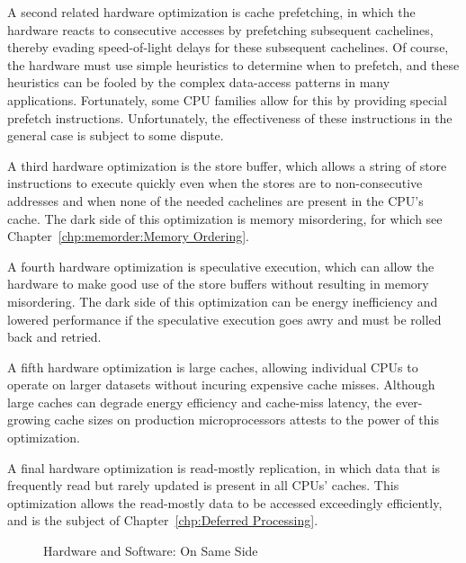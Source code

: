 A second related hardware optimization is cache prefetching, in which
the hardware reacts to consecutive accesses by prefetching subsequent
cachelines, thereby evading speed-of-light delays for these
subsequent cachelines.
Of course, the hardware must use simple heuristics to determine when
to prefetch, and these heuristics can be fooled by the complex data-access
patterns in many applications.
Fortunately, some CPU families allow for this by providing special
prefetch instructions.
Unfortunately, the effectiveness of these instructions in the general
case is subject to some dispute.

A third hardware optimization is the store buffer, which allows a string
of store instructions to execute quickly even when the stores are to
non-consecutive addresses and when none of the needed cachelines are
present in the CPU's cache.
The dark side of this optimization is memory misordering, for which see
Chapter~\ref{chp:memorder:Memory Ordering}.

A fourth hardware optimization is speculative execution, which can
allow the hardware to make good use of the store buffers without
resulting in memory misordering.
The dark side of this optimization can be energy inefficiency and
lowered performance if the speculative execution goes awry and must
be rolled back and retried.

A fifth hardware optimization is large caches, allowing individual
CPUs to operate on larger datasets without incuring expensive cache
misses.
Although large caches can degrade energy efficiency and cache-miss
latency, the ever-growing cache sizes on production microprocessors
attests to the power of this optimization.

A final hardware optimization is read-mostly replication, in which
data that is frequently read but rarely updated is present in all
CPUs' caches.
This optimization allows the read-mostly data to be accessed
exceedingly efficiently, and is the subject of
Chapter~\ref{chp:Deferred Processing}.

\begin{figure}[tb]
\centering
{}
\caption{Hardware and Software: On Same Side}
\end{figure}

